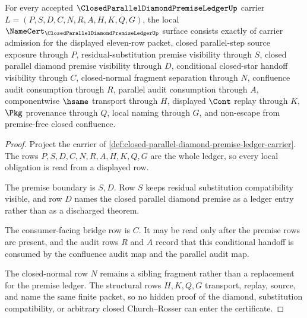 \begin{theorem}
\label{thm:closed-parallel-diamond-premise-ledger-obligations}
For every accepted $\ClosedParallelDiamondPremiseLedgerUp$ carrier $L=(P,S,D,C,N,R,A,H,K,Q,G)$, the local $\NameCert_{\ClosedParallelDiamondPremiseLedgerUp}$ surface consists exactly of carrier admission for the displayed eleven-row packet, closed parallel-step source exposure through $P$, residual-substitution premise visibility through $S$, closed parallel diamond premise visibility through $D$, conditional closed-star handoff visibility through $C$, closed-normal fragment separation through $N$, confluence audit consumption through $R$, parallel audit consumption through $A$, componentwise $\hsame$ transport through $H$, displayed $\Cont$ replay through $K$, $\Pkg$ provenance through $Q$, local naming through $G$, and non-escape from premise-free closed confluence.
\end{theorem}
\begin{proof}
Project the carrier of \autoref{def:closed-parallel-diamond-premise-ledger-carrier}. The rows $P,S,D,C,N,R,A,H,K,Q,G$ are the whole ledger, so every local obligation is read from a displayed row.

The premise boundary is $S,D$. Row $S$ keeps residual substitution compatibility visible, and row $D$ names the closed parallel diamond premise as a ledger entry rather than as a discharged theorem.

The consumer-facing bridge row is $C$. It may be read only after the premise rows are present, and the audit rows $R$ and $A$ record that this conditional handoff is consumed by the confluence audit map and the parallel audit map.

The closed-normal row $N$ remains a sibling fragment rather than a replacement for the premise ledger. The structural rows $H,K,Q,G$ transport, replay, source, and name the same finite packet, so no hidden proof of the diamond, substitution compatibility, or arbitrary closed Church--Rosser can enter the certificate.
\end{proof}

